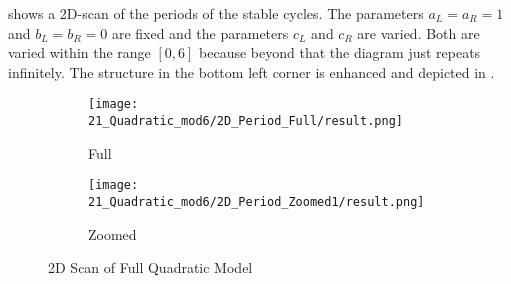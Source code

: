 shows a 2D-scan of the periods of the stable cycles.
The parameters $a_L = a_R = 1$ and $b_L = b_R = 0$ are fixed and the parameters $c_L$ and $c_R$ are varied.
Both are varied within the range $[0, 6]$ because beyond that the diagram just repeats infinitely.
The structure in the bottom left corner is enhanced and depicted in .
\begin{figure}
    \centering
    \begin{subfigure}{0.4\textwidth}
        \centering
        \texttt{[image: 21\_Quadratic\_mod6/2D\_Period\_Full/result.png]}
        \caption{Full}
        \label{fig:quadratic.full.2d.full}
    \end{subfigure}
    \begin{subfigure}{0.4\textwidth}
        \centering
        \texttt{[image: 21\_Quadratic\_mod6/2D\_Period\_Zoomed1/result.png]}
        \caption{Zoomed}
        \label{fig:quadratic.full.2d.z1}
    \end{subfigure}
    \caption{2D Scan of Full Quadratic Model}
\end{figure}
